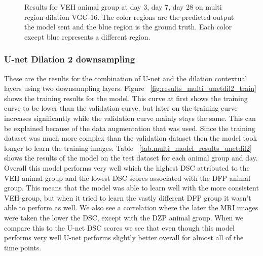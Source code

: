 \begin{figure}[!htb]
  \caption{Results for VEH animal group at day 3, day 7, day 28 on multi region dilation VGG-16. The color regions are the predicted output the model sent and the blue region is the ground truth. Each color except blue represents a different region.}
  \label{fig:results_multi_dilation_VEH}
\end{figure}


\subsubsection{U-net Dilation 2 downsampling}
    These are the results for the combination of U-net and the dilation contextual layers using two downsampling layers. Figure ~\ref{fig:results_multi_unetdil2_train} shows the training results for the model.
    This curve at first shows the training curve to be lower than the validation curve, but later on the training curve increases significantly while the validation curve mainly stays the same. 
    This can be explained because of the data augmentation that was used. Since the training dataset was much more complex than the validation dataset then the model took longer to learn the training images. 
    Table ~\ref{tab.multi_model_results_unetdil2} shows the results of the model on the test dataset for each animal group and day. 
    Overall this model performs very well which the highest DSC attributed to the VEH animal group and the lowest DSC scores associated with the DFP animal group. 
    This means that the model was able to learn well with the more consistent VEH group, but when it tried to learn the vastly different DFP group it wasn't able to perform as well. 
    We also see a correlation where the later the MRI images were taken the lower the DSC, except with the DZP animal group. 
    When we compare this to the U-net DSC scores we see that even though this model performs very well U-net performs slightly better overall for almost all of the time points. 

